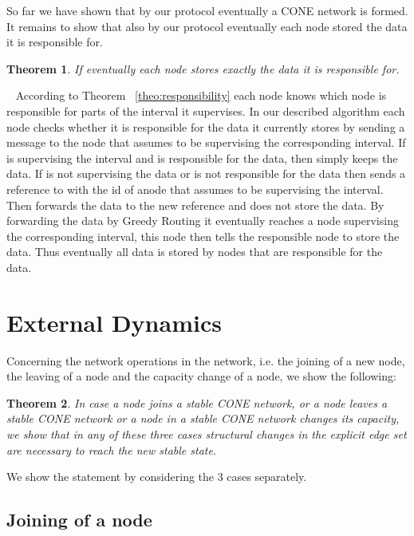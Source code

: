 \documentclass[11pt]{article}
\newtheorem{theorem}{Theorem}[section]
\newcommand{\sq}{\hbox{\rlap{}}}
\newcommand{\qed}{\hspace*{\fill}\sq}
\newenvironment{proof}{\noindent {\bf Proof.}\ }{\qed\par\vskip 4mm\par}
\begin{document}
So far we have shown that by our protocol eventually a CONE network is formed. It remains to show that also by our protocol eventually each node stored the data it is responsible for.

\begin{theorem}\label{theo:datastructure}
If  eventually each node stores exactly the data it is responsible for.
\end{theorem}

\begin{proof}
According to Theorem ~\ref{theo:responsibility} each node knows which node is responsible for parts of the interval it supervises. In our described algorithm each node  checks whether it is responsible for the data it currently stores by sending a message to the node  that  assumes to be supervising the corresponding interval. If  is supervising the interval and  is responsible for the data, then  simply keeps the data. If  is not supervising the data or  is not responsible for the data then  sends a reference to  with the id of anode that  assumes to be supervising the interval. Then  forwards the data to the new reference and does not store the data. By forwarding the data by Greedy Routing it eventually reaches a node supervising the corresponding interval, this node then tells the responsible node to store the data. Thus eventually all data is stored by nodes that are responsible for the data.
\end{proof}



\section{External Dynamics}\label{ops}

Concerning the network operations in the network, i.e. the joining of a new node, the leaving of a node and the capacity change of a node, we show the following:

\begin{theorem}\label{theo:dynam}
In case a node  joins a stable CONE network, or a node  leaves a stable CONE network 
or a node  in a stable CONE network changes its capacity, we show that in any of these three cases  structural changes in the explicit edge set are necessary to reach the new stable state.
\end{theorem}

We show the statement by considering the 3 cases separately.

\subsection{Joining of a node}
\end{document}
